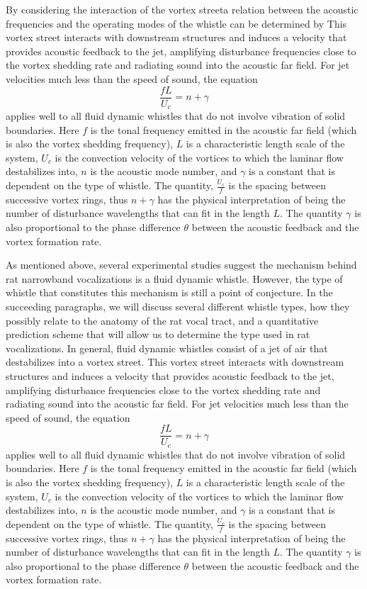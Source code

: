 By considering the interaction of the vortex streeta relation between the acoustic frequencies and the operating modes of the whistle can be determined by This vortex street interacts with downstream structures and induces a velocity that provides acoustic feedback to the jet, amplifying disturbance frequencies close to the vortex shedding rate and radiating sound into the acoustic far field. For jet velocities much less than the speed of sound, the equation
\begin{equation}
\label{eq:whistle}
\frac{fL}{U_{c}}=n+\gamma
\end{equation}
applies well to all fluid dynamic whistles that do not involve vibration of solid boundaries. Here $f$ is the tonal frequency emitted in the acoustic far field (which is also the vortex shedding frequency), $L$ is a characteristic length scale of the system, $U_c$ is the convection velocity of the vortices to which the laminar flow destabilizes into, $n$ is the acoustic mode number, and $\gamma$ is a constant that is dependent on the type of whistle. The quantity, $\frac{U_c}{f}$ is the spacing between successive vortex rings, thus $n+\gamma$ has the physical interpretation of being the number of disturbance wavelengths that can fit in the length $L$. The quantity $\gamma$ is also proportional to the phase difference $\theta$ between the acoustic feedback and the vortex formation rate.

As mentioned above, several experimental studies suggest the mechanism behind rat narrowband vocalizations is a fluid dynamic whistle. However, the type of whistle that constitutes this mechanism is still a point of conjecture. In the succeeding paragraphs, we will discuss several different whistle types, how they possibly relate to the anatomy of the rat vocal tract, and a quantitative prediction scheme that will allow us to determine the type used in rat vocalizations.       
In general, fluid dynamic whistles consist of a jet of air that destabilizes into a vortex street. This vortex street interacts with downstream structures and induces a velocity that provides acoustic feedback to the jet, amplifying disturbance frequencies close to the vortex shedding rate and radiating sound into the acoustic far field. For jet velocities much less than the speed of sound, the equation
\begin{equation}
\label{eq:whistle}
\frac{fL}{U_{c}}=n+\gamma
\end{equation}
applies well to all fluid dynamic whistles that do not involve vibration of solid boundaries. Here $f$ is the tonal frequency emitted in the acoustic far field (which is also the vortex shedding frequency), $L$ is a characteristic length scale of the system, $U_c$ is the convection velocity of the vortices to which the laminar flow destabilizes into, $n$ is the acoustic mode number, and $\gamma$ is a constant that is dependent on the type of whistle. The quantity, $\frac{U_c}{f}$ is the spacing between successive vortex rings, thus $n+\gamma$ has the physical interpretation of being the number of disturbance wavelengths that can fit in the length $L$. The quantity $\gamma$ is also proportional to the phase difference $\theta$ between the acoustic feedback and the vortex formation rate.

